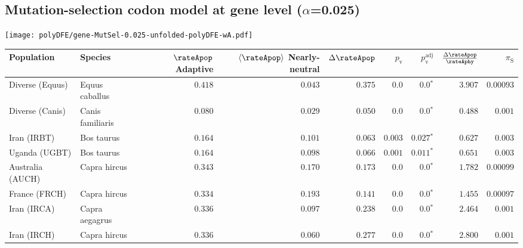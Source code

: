 \subsection{Mutation-selection codon model at gene level ($\alpha$=0.025)}
\begin{center}
    \texttt{[image: polyDFE/gene-MutSel-0.025-unfolded-polyDFE-wA.pdf]}
    \begin{adjustbox}{width = 1\textwidth}
                \begin{tabular}{|l|l|r|r|r|r|r|r|r|}
            \toprule
            Population & Species & \specialcell{$\rateApop$ \\ Adaptive}                & \specialcell{$\left< \rateApop \right>$ \\ Nearly-neutral}                & $\Delta \rateApop $    & $p_{\mathrm{v}}$ & $p_{\mathrm{v}}^{\mathrm{adj}}$ & $\frac{\Delta\rateApop}{\rateAphy}$ & $\pi_{\textrm{S}}$    \\
            \midrule
            Diverse (Equus)                    & Equus caballus          & $ 0.418$ & $ 0.043$ & $ 0.375$ & $0.0$ & $\bm{0.0{^*}}$ & $ 3.907$ & $0.00093$ \\
            Diverse (Canis)                  & Canis familiaris          & $ 0.080$ & $ 0.029$ & $ 0.050$ & $0.0$ & $\bm{0.0{^*}}$ & $ 0.488$ & $ 0.001$ \\
            Iran (IRBT)               & Bos taurus        & $ 0.164$ & $ 0.101$ & $ 0.063$ & $ 0.003$    & $\bm{ 0.027{^*}}$    & $ 0.627$ & $ 0.003$ \\
            Uganda (UGBT)                  & Bos taurus        & $ 0.164$ & $ 0.098$ & $ 0.066$ & $ 0.001$    & $\bm{ 0.011{^*}}$    & $ 0.651$ & $ 0.003$ \\
            Australia (AUCH)                    & Capra hircus      & $ 0.343$ & $ 0.170$ & $ 0.173$ & $0.0$    & $\bm{0.0{^*}}$    & $ 1.782$ & $0.00099$ \\
            France (FRCH)                    & Capra hircus        & $ 0.334$ & $ 0.193$ & $ 0.141$ & $0.0$    & $\bm{0.0{^*}}$    & $ 1.455$ & $0.00097$ \\
            Iran (IRCA)                   & Capra aegagrus        & $ 0.336$ & $ 0.097$ & $ 0.238$ & $0.0$    & $\bm{0.0{^*}}$    & $ 2.464$ & $ 0.001$ \\
            Iran (IRCH)                 & Capra hircus        & $ 0.336$ & $ 0.060$ & $ 0.277$ & $0.0$    & $\bm{0.0{^*}}$    & $ 2.800$ & $ 0.001$ \\

\end{tabular}
\end{adjustbox}
\end{center}
